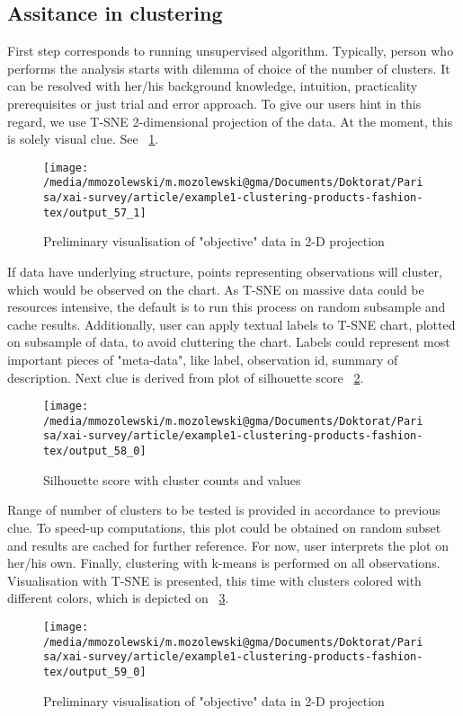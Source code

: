 \documentclass[
 twocolumn,
]{ceurart}
\begin{document}
\subsection{Assitance in clustering}
First step corresponds to running unsupervised algorithm.
Typically, person who performs the analysis starts with dilemma of choice of the number of clusters.
It can be resolved with her/his background knowledge, intuition, practicality prerequisites or just trial and error approach. %
To give our users hint in this regard, we use T-SNE 2-dimensional projection of the data.
At the moment, this is solely visual clue.
See ~\ref{fig:tsne}.
\begin{figure}[h!]
  \centering
  \texttt{[image: /media/mmozolewski/m.mozolewski@gma/Documents/Doktorat/Parisa/xai-survey/article/example1-clustering-products-fashion-tex/output\_57\_1]}
  \caption{Preliminary visualisation of "objective" data in 2-D projection}
  \label{fig:tsne}
\end{figure}
If data have underlying structure, points representing observations will cluster, which would be observed on the chart.
As T-SNE on massive data could be resources intensive, the default is to run this process on random subsample and cache results.
Additionally, user can apply textual labels to T-SNE chart, plotted on subsample of data, to avoid cluttering the chart. %
Labels could represent most important pieces of "meta-data", like label, observation id, summary of description.
Next clue is derived from plot of silhouette score ~\ref{fig:silhouette}.
\begin{figure}[h!]
  \centering
  \texttt{[image: /media/mmozolewski/m.mozolewski@gma/Documents/Doktorat/Parisa/xai-survey/article/example1-clustering-products-fashion-tex/output\_58\_0]}
  \caption{Silhouette score with cluster counts and values}
  \label{fig:silhouette}
\end{figure}
Range of number of clusters to be tested is provided in accordance to previous clue.
To speed-up computations, this plot could be obtained on random subset and results are cached for further reference.
For now, user interprets the plot on her/his own.
Finally, clustering with k-means is performed on all observations.
Visualisation with T-SNE is presented, this time with clusters colored with different colors, which is depicted on ~\ref{fig:kmeans}.
\begin{figure}[h!]
  \centering
  \texttt{[image: /media/mmozolewski/m.mozolewski@gma/Documents/Doktorat/Parisa/xai-survey/article/example1-clustering-products-fashion-tex/output\_59\_0]}
  \caption{Preliminary visualisation of "objective" data in 2-D projection}
  \label{fig:kmeans}
\end{figure}
\end{document}
